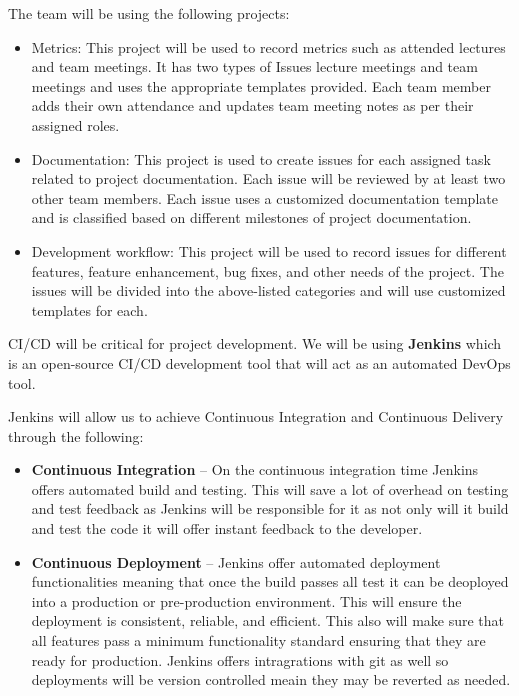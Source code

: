 \documentclass{article}
\begin{document}
The team will be using the following projects:

\begin{itemize}
\item Metrics: This project will be used to record metrics such as attended lectures and team meetings. It has two types of Issues lecture meetings and team meetings and uses the appropriate templates provided. Each team member adds their own attendance and updates team meeting notes as per their assigned roles.
\item Documentation: This project is used to create issues for each assigned task related to project documentation. Each issue will be reviewed by at least two other team members. Each issue uses a customized documentation template and is classified based on different milestones of project documentation. 
\item Development workflow: This project will be used to record issues for different features, feature enhancement, bug fixes, and other needs of the project. The issues will be divided into the above-listed categories and will use customized templates for each. 
\end{itemize}

CI/CD will be critical for project development. We will be using \textbf{Jenkins} which is an open-source CI/CD development tool that will act as an automated DevOps tool.

Jenkins will allow us to achieve Continuous Integration and Continuous Delivery through the following:
\begin{itemize}
  \item \textbf{Continuous Integration} -- On the continuous integration time Jenkins offers automated build and testing. This will save a lot of overhead on testing and test feedback as Jenkins will be responsible for it as not only will it build and test the code it will offer instant feedback to the developer.
  \item \textbf{Continuous Deployment} -- Jenkins offer automated deployment functionalities meaning that once the build passes all test it can be deoployed into a production or pre-production environment. This will ensure the deployment is consistent, reliable, and efficient. This also will make sure that all features pass a minimum functionality standard ensuring that they are ready for production. Jenkins offers intragrations with git as well so deployments will be version controlled meain they may be reverted as needed.
\end{itemize}
\end{document}
